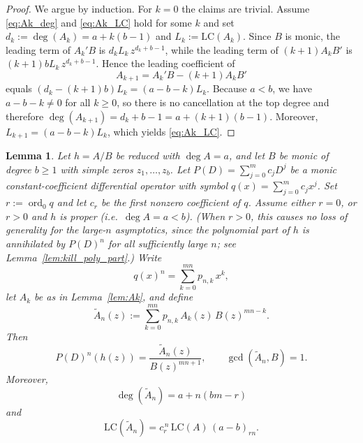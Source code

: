 \documentclass[12pt]{article}
\theoremstyle{plain}
\newtheorem{lemma}[theorem]{Lemma}
\theoremstyle{definition}
\begin{document}
\begin{proof}
We argue by induction.
For $k=0$ the claims are trivial.
Assume \eqref{eq:Ak_deg} and \eqref{eq:Ak_LC} hold for some $k$ and set $d_k:=\deg(A_k)=a+k(b-1)$ and $L_k:=\mathrm{LC}(A_k)$.
Since $B$ is monic, the leading term of $A_k'B$ is $d_kL_k\,z^{d_k+b-1}$, while the leading term of $(k+1)A_kB'$ is $(k+1)bL_k\,z^{d_k+b-1}$.
Hence the leading coefficient of
$$A_{k+1}=A_k'B-(k+1)A_kB'$$
equals $(d_k-(k+1)b)L_k=(a-b-k)L_k$.
Because $a<b$, we have $a-b-k\neq0$ for all $k\ge0$, so there is no cancellation at the top degree and therefore
$\deg(A_{k+1})=d_k+b-1=a+(k+1)(b-1)$.
Moreover,
$L_{k+1}=(a-b-k)L_k$, which yields \eqref{eq:Ak_LC}.
\end{proof}

\begin{lemma}\label{lem_deg_Pm}
Let $h=A/B$ be reduced with $\deg A=a$, and let $B$ be monic of degree $b\ge1$ with simple zeros $z_1,\dots,z_b$.
Let $P(D)=\sum_{j=0}^{m}c_jD^j$ be a monic constant-coefficient differential operator with symbol $q(x)=\sum_{j=0}^{m}c_jx^j$.
Set $r:=\operatorname{ord}_0 q$ and let $c_r$ be the first nonzero coefficient of $q$.
Assume either $r=0$, or $r>0$ and $h$ is proper (i.e.\ $\deg A=a<b$).
(When $r>0$, this causes no loss of generality for the large-$n$ asymptotics, since the polynomial part of $h$ is annihilated by $P(D)^n$ for all sufficiently large $n$; see Lemma~\ref{lem:kill_poly_part}.)
Write
$$q(x)^n=\sum_{k=0}^{mn} p_{n,k}\,x^k,$$
let $A_k$ be as in Lemma~\ref{lem:Ak}, and define
$$\widetilde A_n(z):=\sum_{k=0}^{mn} p_{n,k}\,A_k(z)\,B(z)^{mn-k}.$$
Then
$$P(D)^n(h(z))=\frac{\widetilde A_n(z)}{B(z)^{mn+1}},\qquad \gcd(\widetilde A_n,B)=1.$$
Moreover,
$$\deg(\widetilde A_n)=a+n(bm-r)$$
and
$$\mathrm{LC}(\widetilde A_n)=c_r^{\,n}\,\mathrm{LC}(A)\,(a-b)_{rn}.$$
\end{lemma}
\end{document}
